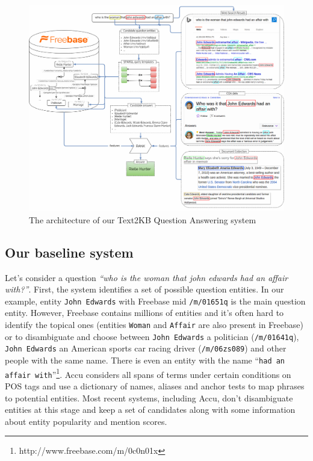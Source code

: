 \begin{figure}[!ht]
\centering
\includegraphics[width=\textwidth]{img/Text2KB_model}
\caption{The architecture of our Text2KB Question Answering system}
\label{fig:model}
\end{figure}


\subsection{Our baseline system}

Let's consider a question \textit{``who is the woman that john edwards had an affair with?''}.
First, the system identifies a set of possible question entities.
In our example, entity \texttt{John Edwards} with Freebase mid \texttt{/m/01651q} is the main question entity.
However, Freebase contains millions of entities and it's often hard to identify the topical ones (\eg entities \texttt{Woman} and \texttt{Affair} are also present in Freebase) or to disambiguate and choose between \texttt{John Edwards} a politician (\texttt{/m/01641q}), \texttt{John Edwards} an American sports car racing driver (\texttt{/m/06zs089}) and other people with the same name.
There is even an entity with the name ``\texttt{had an affair with}''\footnote{http://www.freebase.com/m/0c0n01x}.
Accu considers all spans of terms under certain conditions on POS tags and use a dictionary of names, aliases and anchor tests \cite{SPITKOVSKY12.266} to map phrases to potential entities.
Most recent systems, including Accu, don't disambiguate entities at this stage and keep a set of candidates along with some information about entity popularity and mention scores.

